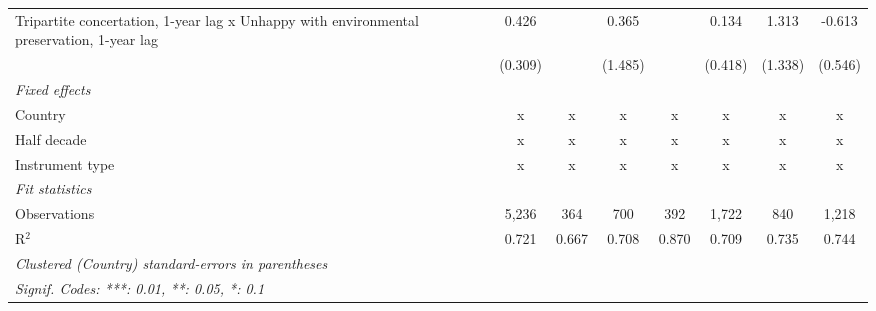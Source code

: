 \begin{table}[htbp]
\begin{tabular}{lccccccc}
      Tripartite concertation, 1-year lag x Unhappy with environmental preservation, 1-year lag & 0.426         &                           & 0.365          &                  & 0.134           & 1.313           & -0.613\\   
                                                                                                & (0.309)       &                           & (1.485)        &                  & (0.418)         & (1.338)         & (0.546)\\   
      \emph{Fixed effects}\\
      Country                                                                                   & x             & x                         & x              & x                & x               & x               & x\\  
      Half decade                                                                               & x             & x                         & x              & x                & x               & x               & x\\  
      Instrument type                                                                           & x             & x                         & x              & x                & x               & x               & x\\  
      \midrule \emph{Fit statistics}\\
      Observations                                                                              & 5,236         & 364                       & 700            & 392              & 1,722           & 840             & 1,218\\  
      R$^2$                                                                                     & 0.721         & 0.667                     & 0.708          & 0.870            & 0.709           & 0.735           & 0.744\\  
      \midrule
      \multicolumn{8}{l}{\emph{Clustered (Country) standard-errors in parentheses}}\\
      \multicolumn{8}{l}{\emph{Signif. Codes: ***: 0.01, **: 0.05, *: 0.1}}\\
   \end{tabular}
\end{table}


